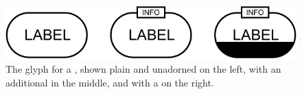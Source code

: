 \begin{figure}[H]
  \centering
  \includegraphics{images/simple_chemical-combined}
  \caption{The \PD glyph for a , shown plain and unadorned on the left, with an additional  in the middle, and with a  on the right.}
  \label{fig:simpleChemical}
\end{figure}

